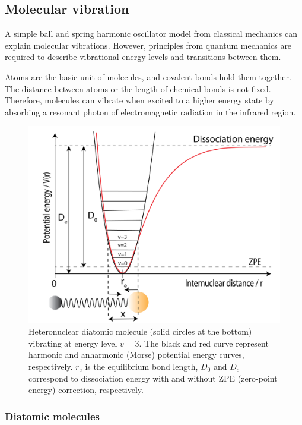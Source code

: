 \subsection{Molecular vibration}
\label{sec:mol-vibration}

A simple ball and spring harmonic oscillator model from classical mechanics can explain molecular vibrations. However, principles from quantum mechanics are required to describe vibrational energy levels and transitions between them.

Atoms are the basic unit of molecules, and covalent bonds hold them together. The distance between atoms or the length of chemical bonds is not fixed. Therefore, molecules can vibrate when excited to a higher energy state by absorbing a resonant photon of electromagnetic radiation in the infrared region.
\begin{figure}[!htb]
    \centering
    \includegraphics[scale=0.5]{figures/methods/harmonic-oscillator-01.png}
    \caption{Heteronuclear diatomic molecule (solid circles at the bottom) vibrating at energy level $v=3$. The black and red curve represent harmonic and anharmonic (Morse) potential energy curves, respectively. $r_e$ is the equilibrium bond length, $D_0$ and $D_e$ correspond to dissociation energy with and without ZPE (zero-point energy) correction, respectively. }
    \label{fig:vibration:oscillator}
\end{figure}

\subsubsection{Diatomic molecules}
\label{sec:mol-vibration:diatomic}

